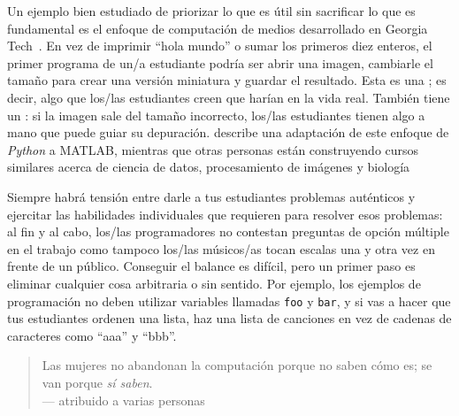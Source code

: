 Un ejemplo bien estudiado de priorizar lo que es útil
sin sacrificar lo que es fundamental
es el enfoque de computación de medios desarrollado en Georgia Tech~\cite{Guzd2013}.
En vez de imprimir ``hola mundo'' o sumar los primeros diez enteros,
el primer programa de un/a estudiante podría ser abrir una imagen,
cambiarle el tamaño para crear una versión miniatura
y guardar el resultado.
Esta es una ; 
es decir, algo que los/las estudiantes creen que harían en la vida real.
También tiene un :
si la imagen sale del tamaño incorrecto,
los/las estudiantes tienen algo a mano que puede guiar su depuración.
\cite{Lee2013} describe una adaptación de este enfoque de \emph{Python} a MATLAB,
mientras que otras personas están construyendo cursos similares acerca de ciencia de datos, procesamiento de imágenes
y biología~\cite{Dahl2018,Meys2018,Ritz2018}

Siempre habrá tensión entre darle a tus estudiantes problemas auténticos
y ejercitar las habilidades individuales que requieren para resolver esos problemas:
al fin y al cabo,
los/las programadores no contestan preguntas de opción múltiple en el trabajo
como tampoco los/las músicos/as tocan escalas una y otra vez en frente de un público.
Conseguir el balance es difícil,
pero un primer paso es eliminar cualquier cosa arbitraria o sin sentido.
Por ejemplo,
los ejemplos de programación no deben utilizar variables llamadas \texttt{foo} y \texttt{bar},
y si vas a hacer que tus estudiantes ordenen una lista,
haz una lista de canciones en vez de cadenas de caracteres como ``aaa'' y ``bbb''.


\begin{quote}

  Las mujeres no abandonan la computación porque no saben cómo es;
  se van porque \emph{sí saben}. \\
  --- atribuido a varias personas

\end{quote}

